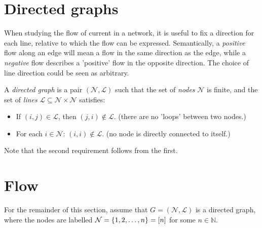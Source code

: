 \documentclass[main.tex]{subfiles}
\begin{document}

\section{Directed graphs}
When studying the flow of current in a network, it is useful to fix a direction for each line, relative to which the flow can be expressed.
Semantically, a \emph{positive} flow along an edge will mean a flow in the same direction as the edge, while a \emph{negative} flow describes a 'positive' flow in the opposite direction. The choice of line direction could be seen as arbitrary. 
\begin{definition}
A \emph{directed graph} is a pair $(\mathcal{N},\mathcal{L})$ such that the set of \emph{nodes} $\mathcal{N}$ is finite, and the set of \emph{lines} $\mathcal{L}\subseteq \mathcal{N} \times \mathcal{N}$ satisfies:
\begin{itemize}
    \item If $(i,j) \in \mathcal{L}$, then $(j,i) \notin \mathcal{L}$. (\ie there are no 'loops' between two nodes.)
    \item For each $i \in \mathcal{N}$: $(i,i) \notin \mathcal{L}$. (\ie no node is directly connected to itself.)
\end{itemize}
\end{definition}
\begin{remark}
Note that the second requirement follows from the first.
\end{remark}

\section{Flow}
For the remainder of this section, assume that $G=(\mathcal{N},\mathcal{L})$ is a directed graph, where the nodes are labelled $\mathcal{N}=\{1,2,\dots,n\}=[n]$ for some $n \in \mathbb{N}$.
\end{document}
